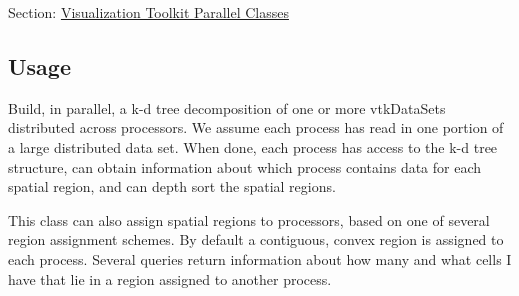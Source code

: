 Section\-: \hyperlink{sec_vtkparallel}{Visualization Toolkit Parallel Classes} \hypertarget{vtkwidgets_vtkxyplotwidget_Usage}{}\subsection{Usage}\label{vtkwidgets_vtkxyplotwidget_Usage}
Build, in parallel, a k-\/d tree decomposition of one or more vtk\-Data\-Sets distributed across processors. We assume each process has read in one portion of a large distributed data set. When done, each process has access to the k-\/d tree structure, can obtain information about which process contains data for each spatial region, and can depth sort the spatial regions.

This class can also assign spatial regions to processors, based on one of several region assignment schemes. By default a contiguous, convex region is assigned to each process. Several queries return information about how many and what cells I have that lie in a region assigned to another process.

